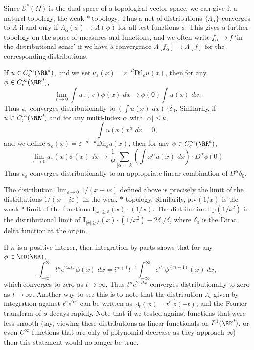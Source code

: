 Since $\DD^*(\Omega)$ is the dual space of a topological vector space, we can give it a natural topology, the weak $*$ topology. Thus a net of distributions $\{ \Lambda_\alpha \}$ converges to $\Lambda$ if and only if $\Lambda_\alpha(\phi) \to \Lambda(\phi)$ for all test functions $\phi$. This gives a further topology on the space of measures and functions, and we often write $f_\alpha \to f$ `in the distributional sense' if we have a convergence $\Lambda[f_\alpha] \to \Lambda[f]$ for the corresponding distributions.

\begin{example}
    If $u \in C_c^\infty(\RR^d)$, and we set $u_\varepsilon(x) = \varepsilon^{-d} \text{Dil}_\varepsilon u(x)$, then for any $\phi \in C_c^\infty(\RR^d)$,
    \[ \lim_{\varepsilon \to 0} \int u_\varepsilon(x) \phi(x)\; dx \to \phi(0) \int u(x)\; dx. \]
    Thus $u_\varepsilon$ converges distributionally to $(\int u(x)\; dx) \cdot \delta_0$. Similarily, if $u \in C_c^\infty(\RR^d)$ and for any multi-index $\alpha$ with $|\alpha| \leq k$,
    \[ \int u(x) x^\alpha\; dx = 0, \]
    and we define $u_\varepsilon(x) = \varepsilon^{-d-k} \text{Dil}_\varepsilon u(x)$, then for any $\phi \in C_c^\infty(\RR^d)$,
    \[ \lim_{\varepsilon \to 0} u_\varepsilon(x) \phi(x)\; dx \to \frac{1}{k!} \sum_{|\alpha| = k} \left( \int x^\alpha u(x)\; dx \right) \cdot D^\alpha \phi(0) \]
    Thus $u_\varepsilon$ converges distributionally to an appropriate linear combination of $D^\alpha \delta_0$.
\end{example}

\begin{example}
    The distribution $\lim_{\varepsilon \to 0} 1/(x + i\varepsilon)$ defined above is precisely the limit of the distributions $1/(x + i \varepsilon)$ in the weak $*$ topology. Similarily, $\text{p.v}(1/x)$ is the weak $*$ limit of the functions $\mathbf{I}_{|x| \geq \delta}(x) \cdot (1/x)$. The distribution $\text{f.p}(1/x^2)$ is the distributional limit of $\mathbf{I}_{|x| \geq \delta}(x) \cdot (1/x^2) - 2 \delta_0 / \delta$, where $\delta_0$ is the Dirac delta function at the origin.
\end{example}

\begin{example}
    If $n$ is a positive integer, then integration by parts shows that for any $\phi \in \DD(\RR)$,
    \[ \int_{-\infty}^\infty t^n e^{2 \pi itx} \phi(x)\; dx = i^{n+1} t^{-1} \int_{-\infty}^\infty e^{itx} \phi^{(n+1)}(x)\; dx, \]
    which converges to zero as $t \to \infty$. Thus $t^n e^{2 \pi itx}$ converges distributionally to zero as $t \to \infty$. Another way to see this is to note that the distribution $\Lambda_t$ given by integration against $t^n e^{itx}$ can be written as $\Lambda_t(\phi) = t^n \widehat{\phi}(-t)$, and the Fourier transform of $\phi$ decays rapidly. Note that if we tested against functions that were less smooth (say, viewing these distributions as linear functionals on $L^1(\RR^d)$, or even $C^\infty$ functions that are only of polynomial decrease as they approach $\infty$) then this statement would no longer be true.
\end{example}

